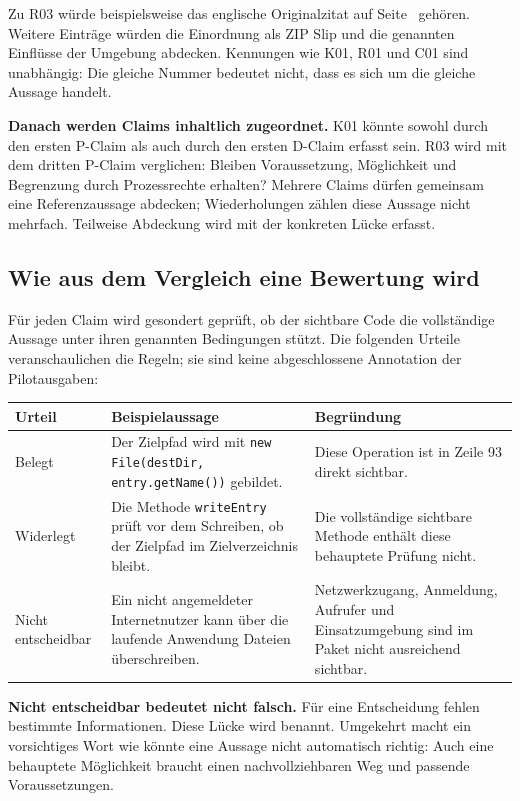 \documentclass[10pt,a4paper]{article}
\begin{document}
Zu R03 würde beispielsweise das englische Originalzitat auf Seite~\pageref{sec:zip-example} gehören. Weitere Einträge würden die Einordnung als ZIP Slip und die genannten Einflüsse der Umgebung abdecken. Kennungen wie K01, R01 und C01 sind unabhängig: Die gleiche Nummer bedeutet nicht, dass es sich um die gleiche Aussage handelt.

\textbf{Danach werden Claims inhaltlich zugeordnet.} K01 könnte sowohl durch den ersten P-Claim als auch durch den ersten D-Claim erfasst sein. R03 wird mit dem dritten P-Claim verglichen: Bleiben Voraussetzung, Möglichkeit und Begrenzung durch Prozessrechte erhalten? Mehrere Claims dürfen gemeinsam eine Referenzaussage abdecken; Wiederholungen zählen diese Aussage nicht mehrfach. Teilweise Abdeckung wird mit der konkreten Lücke erfasst.

\newpage
\subsection{Wie aus dem Vergleich eine Bewertung wird}
Für jeden Claim wird gesondert geprüft, ob der sichtbare Code die vollständige Aussage unter ihren genannten Bedingungen stützt. Die folgenden Urteile veranschaulichen die Regeln; sie sind keine abgeschlossene Annotation der Pilotausgaben:

\begin{tabularx}{\linewidth}{@{}p{25mm}YY@{}}
\toprule
\textbf{Urteil} & \textbf{Beispielaussage} & \textbf{Begründung} \\ \midrule
Belegt & \glqq{}Der Zielpfad wird mit \texttt{new File(destDir, entry.getName())} gebildet.\grqq{} & Diese Operation ist in Zeile 93 direkt sichtbar. \\
Widerlegt & \glqq{}Die Methode \texttt{writeEntry} prüft vor dem Schreiben, ob der Zielpfad im Zielverzeichnis bleibt.\grqq{} & Die vollständige sichtbare Methode enthält diese behauptete Prüfung nicht. \\
Nicht entscheidbar & \glqq{}Ein nicht angemeldeter Internetnutzer kann über die laufende Anwendung Dateien überschreiben.\grqq{} & Netzwerkzugang, Anmeldung, Aufrufer und Einsatzumgebung sind im Paket nicht ausreichend sichtbar. \\
\bottomrule
\end{tabularx}

\textbf{Nicht entscheidbar bedeutet nicht falsch.} Für eine Entscheidung fehlen bestimmte Informationen. Diese Lücke wird benannt. Umgekehrt macht ein vorsichtiges Wort wie \glqq{}könnte\grqq{} eine Aussage nicht automatisch richtig: Auch eine behauptete Möglichkeit braucht einen nachvollziehbaren Weg und passende Voraussetzungen.
\end{document}
